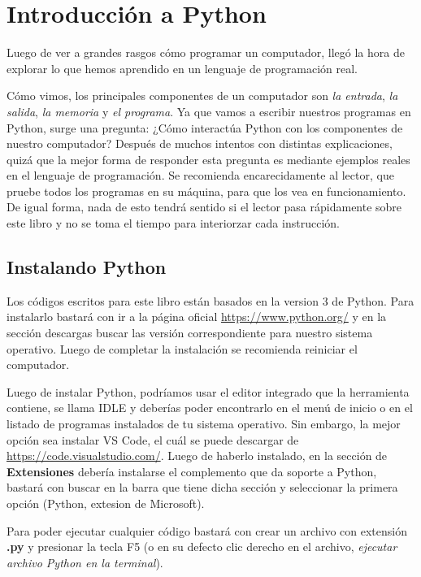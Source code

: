 \chapter{Introducción a Python}

Luego de ver a grandes rasgos cómo programar un computador, llegó la hora de explorar lo que hemos aprendido en un lenguaje de programación real. 

Cómo vimos, los principales componentes de un computador son \emph{la entrada}, \emph{la salida}, \emph{la memoria} y \emph{el programa}. Ya que vamos a escribir nuestros programas en Python, surge una pregunta: ¿Cómo interactúa Python con los componentes de nuestro computador? Después de muchos intentos con distintas explicaciones, quizá que la mejor forma de responder esta pregunta es mediante ejemplos reales en el lenguaje de programación. Se recomienda encarecidamente al lector, que pruebe todos los programas en su máquina, para que los vea en funcionamiento. De igual forma, nada de esto tendrá sentido si el lector pasa rápidamente sobre este libro y no se toma el tiempo para interiorzar cada instrucción.

\section{Instalando Python}

Los códigos escritos para este libro están basados en la version 3 de Python. Para instalarlo bastará con ir a la página oficial \url{https://www.python.org/} y en la sección descargas buscar las versión correspondiente para nuestro sistema operativo. Luego de completar la instalación se recomienda reiniciar el computador.

Luego de instalar Python, podríamos usar el editor integrado que la herramienta contiene, se llama IDLE y deberías poder encontrarlo en el menú de inicio o en el listado de programas instalados de tu sistema operativo. Sin embargo, la mejor opción sea instalar VS Code, el cuál se puede descargar de \url{https://code.visualstudio.com/}. Luego de haberlo instalado, en la sección de \textbf{Extensiones} debería instalarse el complemento que da soporte a Python, bastará con buscar en la barra que tiene dicha sección y seleccionar la primera opción (Python, extesion de Microsoft).

Para poder ejecutar cualquier código bastará con crear un archivo con extensión \textbf{.py} y presionar la tecla F5 (o en su defecto clic derecho en el archivo, \emph{ejecutar archivo Python en la terminal}).

